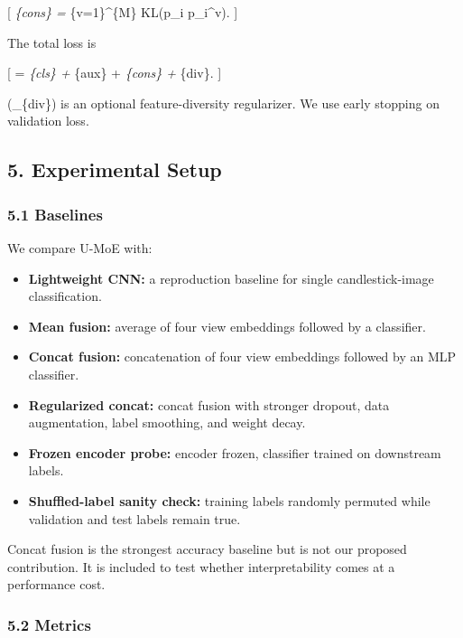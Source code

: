 \documentclass[
]{article}
\providecommand{\tightlist}{%
  \setlength{\itemsep}{0pt}\setlength{\parskip}{0pt}}
\begin{document}
{[} \emph{\{cons\} = \sum}\{v=1\}\^{}\{M\} KL(p\_i
\parallel p\_i\^{}v). {]}

The total loss is

{[}  = \emph{\{cls\} + \beta{}}\{aux\} +
\eta{}\emph{\{cons\} + \gamma{}}\{div\}. {]}

(\_\{div\}) is an optional feature-diversity regularizer. We
use early stopping on validation loss.

\subsection{5. Experimental Setup}\label{experimental-setup}

\subsubsection{5.1 Baselines}\label{baselines}

We compare U-MoE with:

\begin{itemize}
\tightlist
\item
  \textbf{Lightweight CNN:} a reproduction baseline for single
  candlestick-image classification.
\item
  \textbf{Mean fusion:} average of four view embeddings followed by a
  classifier.
\item
  \textbf{Concat fusion:} concatenation of four view embeddings followed
  by an MLP classifier.
\item
  \textbf{Regularized concat:} concat fusion with stronger dropout, data
  augmentation, label smoothing, and weight decay.
\item
  \textbf{Frozen encoder probe:} encoder frozen, classifier trained on
  downstream labels.
\item
  \textbf{Shuffled-label sanity check:} training labels randomly
  permuted while validation and test labels remain true.
\end{itemize}

Concat fusion is the strongest accuracy baseline but is not our proposed
contribution. It is included to test whether interpretability comes at a
performance cost.

\subsubsection{5.2 Metrics}\label{metrics}
\end{document}
